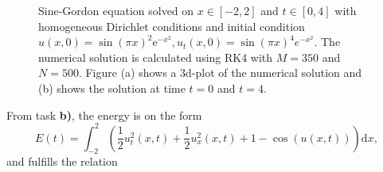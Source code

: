 \begin{figure}
\centering
{}\hspace{0mm}
\hspace{0mm}
\caption{Sine-Gordon equation solved on $x \in [-2,2]$ and $t \in [0,4]$ with homogeneous Dirichlet conditions and initial condition $u(x,0)=\sin(\pi x)^2 \mathrm{e}^{-x^2}, u_t(x,0) = \sin{(\pi x)^4e^{-x^2}}$. The numerical solution is calculated using RK4 with $M=350$ and $N=500$. Figure (a) shows a 3d-plot of the numerical solution and (b) shows the solution at time $t=0$ and $t=4$.}
\end{figure}

From task \textbf{b)}, the energy is on the form 
\begin{equation*}
    E(t) = \int_{-2}^2 \left(\frac{1}{2}u_t^2(x,t) + \frac{1}{2}u_x^2(x,t)+ 1 -\cos{(u(x,t))}\right) \mathrm{d}x,
\end{equation*}
and fulfills the relation

